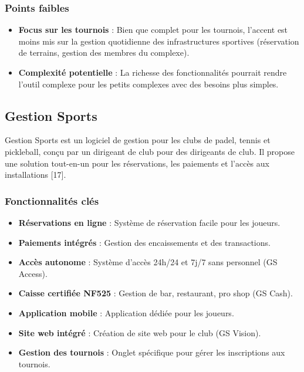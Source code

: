 \documentclass{article}
\begin{document}
\subsubsection{Points faibles}
\begin{itemize}
    \item \textbf{Focus sur les tournois} : Bien que complet pour les tournois, l'accent est moins mis sur la gestion quotidienne des infrastructures sportives (réservation de terrains, gestion des membres du complexe).
    \item \textbf{Complexité potentielle} : La richesse des fonctionnalités pourrait rendre l'outil complexe pour les petits complexes avec des besoins plus simples.
\end{itemize}

\subsection{Gestion Sports}

Gestion Sports est un logiciel de gestion pour les clubs de padel, tennis et pickleball, conçu par un dirigeant de club pour des dirigeants de club. Il propose une solution tout-en-un pour les réservations, les paiements et l'accès aux installations [17].

\subsubsection{Fonctionnalités clés}
\begin{itemize}
    \item \textbf{Réservations en ligne} : Système de réservation facile pour les joueurs.
    \item \textbf{Paiements intégrés} : Gestion des encaissements et des transactions.
    \item \textbf{Accès autonome} : Système d'accès 24h/24 et 7j/7 sans personnel (GS Access).
    \item \textbf{Caisse certifiée NF525} : Gestion de bar, restaurant, pro shop (GS Cash).
    \item \textbf{Application mobile} : Application dédiée pour les joueurs.
    \item \textbf{Site web intégré} : Création de site web pour le club (GS Vision).
    \item \textbf{Gestion des tournois} : Onglet spécifique pour gérer les inscriptions aux tournois.
\end{itemize}
\end{document}
